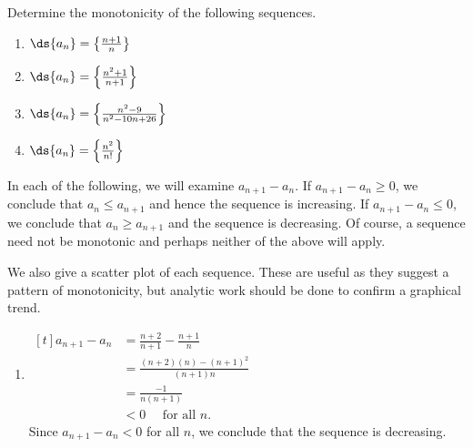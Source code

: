 
\begin{example}\label{ex_seq7}%
Determine the monotonicity of the following sequences.
\begin{multicols}{2}
\begin{enumerate}
\item $\ds \{a_n\} = \left\{\frac{n+1}n\right\}$
\item	$\ds \{a_n\} = \left\{\frac{n^2+1}{n+1}\right\}$	
\item $\ds \{a_n\} = \left\{\frac{n^2-9}{n^2-10n+26}\right\}$
\item	$\ds \{a_n\} = \left\{\frac{n^2}{n!}\right\}$	
\end{enumerate}
\end{multicols}
\solution
In each of the following, we will examine $a_{n+1}-a_n$. If $a_{n+1}-a_n \ge0$, we conclude that $a_n\le a_{n+1}$ and hence the sequence is increasing. If $a_{n+1}-a_n\le0$, we conclude that $a_n\ge a_{n+1}$ and the sequence is decreasing. Of course, a sequence need not be monotonic and perhaps neither of the above will apply.

We also give a scatter plot of each sequence. These are useful as they suggest a pattern of monotonicity, but analytic work should be done to confirm a graphical trend.

\begin{enumerate}
\item \hfill$\begin{aligned}[t]
a_{n+1}-a_n &= \frac{n+2}{n+1} - \frac{n+1}{n} \\		
	&= \frac{(n+2)(n)-(n+1)^2}{(n+1)n} \\
	&=	\frac{-1}{n(n+1)} \\
	&<0 \quad\text{ for all $n$.}
\end{aligned}$\hfill\null\\
%
%
Since $a_{n+1}-a_n<0$ for all $n$, we conclude that the sequence is decreasing.


\end{enumerate}
\end{example}
